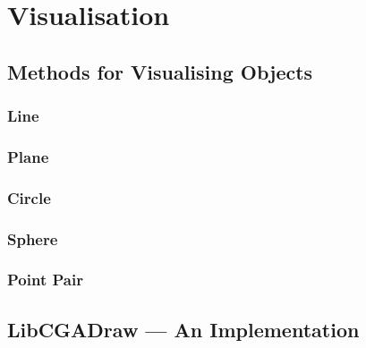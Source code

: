 \chapter{Visualisation}

\section{Methods for Visualising Objects}
\subsection{Line}
\subsection{Plane}
\subsection{Circle}
\subsection{Sphere}
\subsection{Point Pair}

\section{LibCGADraw --- An Implementation}

